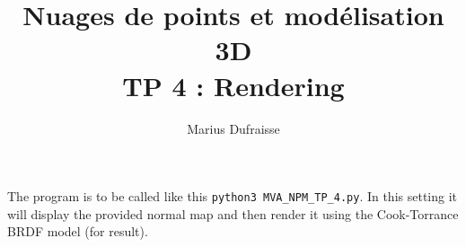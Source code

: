 \documentclass[french]{article}
\begin{document}
\title{Nuages de points et modélisation 3D\\
TP 4 : Rendering}
\author{Marius Dufraisse}
\date{}

\maketitle

The program is to be called like this \texttt{python3 MVA\_NPM_TP\_4.py}. In this setting it will display the provided normal map and then render it using the Cook-Torrance BRDF model (for result).
\end{document}
